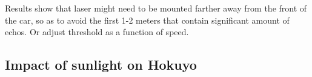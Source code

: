 Results show that laser might need to be mounted farther away from the front of the car, so as to avoid the first 1-2 meters that contain significant amount of echos. Or adjust threshold as a function of speed.

\subsection{Impact of sunlight on Hokuyo}
